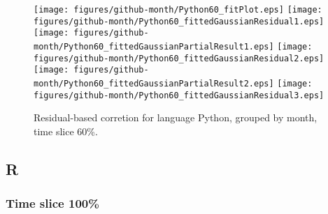 \begin{figure}[t]
\centering
{}
{\texttt{[image: figures/github-month/Python60\_fitPlot.eps]}}
{\texttt{[image: figures/github-month/Python60\_fittedGaussianResidual1.eps]}}
{\texttt{[image: figures/github-month/Python60\_fittedGaussianPartialResult1.eps]}}
{\texttt{[image: figures/github-month/Python60\_fittedGaussianResidual2.eps]}}
{\texttt{[image: figures/github-month/Python60\_fittedGaussianPartialResult2.eps]}}
{\texttt{[image: figures/github-month/Python60\_fittedGaussianResidual3.eps]}}
\caption{Residual-based corretion for language Python, grouped by month, time slice 60\%.}
\end{figure}


\FloatBarrier


\subsection{R}

\subsubsection{Time slice 100\%}

